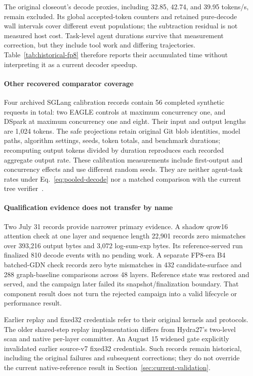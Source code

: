 The original closeout's decode proxies, including 32.85, 42.74, and 39.95 tokens/s, remain excluded. Its global accepted-token counters and retained pure-decode wall intervals cover different event populations; the subtraction residual is not measured host cost. Task-level agent durations survive that measurement correction, but they include tool work and differing trajectories. Table~\ref{tab:historical-fp8} therefore reports their accumulated time without interpreting it as a current decoder speedup.

\paragraph{Other recovered comparator coverage}
Four archived SGLang calibration records contain 56 completed synthetic requests in total: two EAGLE controls at maximum concurrency one, and DSpark at maximum concurrency one and eight. Their input and output lengths are 1,024 tokens. The safe projections retain original Git blob identities, model paths, algorithm settings, seeds, token totals, and benchmark durations; recomputing output tokens divided by duration reproduces each recorded aggregate output rate. These calibration measurements include first-output and concurrency effects and use different random seeds. They are neither agent-task rates under Eq.~\ref{eq:pooled-decode} nor a matched comparison with the current tree verifier~\cite{lumo2026archive}.

\paragraph{Qualification evidence does not transfer by name}
Two July 31 records provide narrower primary evidence. A shadow qrow16 attention check at one layer and sequence length 22,901 records zero mismatches over 393,216 output bytes and 3,072 log-sum-exp bytes. Its reference-served run finalized 810 decode events with no pending work. A separate FP8-era B4 batched-GDN check records zero byte mismatches in 432 candidate-surface and 288 graph-baseline comparisons across 48 layers. Reference state was restored and served, and the campaign later failed its snapshot/finalization boundary. That component result does not turn the rejected campaign into a valid lifecycle or performance result.

Earlier replay and fixed32 credentials refer to their original kernels and protocols. The older shared-step replay implementation differs from Hydra27's two-level scan and native per-layer committer. An August 15 widened gate explicitly invalidated earlier source-v7 fixed32 credentials. Such records remain historical, including the original failures and subsequent corrections; they do not override the current native-reference result in Section~\ref{sec:current-validation}.

